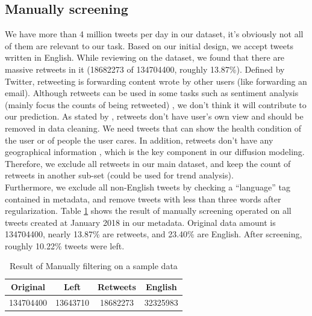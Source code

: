\subsection{Manually screening}
\label{sec:Manually screening}
We have more than 4 million tweets per day in our dataset, it's obviously not all of them are relevant to our task. Based on our initial design, we accept tweets written in English. While reviewing on the dataset, we found that there are massive retweets in it (18682273 of 134704400, roughly 13.87\%). Defined by Twitter\cite{twitter_dev}, retweeting is forwarding content wrote by other users (like forwarding an email). Although retweets can be used in some tasks such as sentiment analysis (mainly focus the counts of being retweeted) \cite{perdana2018combining}, we don't think it will contribute to our prediction. As stated by \cite{kim2016competitive}, retweets don't have user's own view and should be removed in data cleaning. We need tweets that can show the health condition of the user or of people the user cares. In addition, retweets don't have any geographical information \cite{twitter_dev}, which is the key component in our diffusion modeling. Therefore, we exclude all retweets in our main dataset, and keep the count of retweets in another sub-set (could be used for trend analysis).\\ Furthermore, we exclude all non-English tweets by checking a ``language'' tag contained in metadata, and remove tweets with less than three words after regularization. Table \ref{tab:manual} shows the result of manually screening operated on all tweets created at January 2018 in our metadata. Original data amount is 134704400, nearly 13.87\% are retweets, and 23.40\% are English. After screening, roughly 10.22\% tweets were left.
\begin{table}[!htbp]
    \centering
    \hspace{0.5cm}
    \begin{tabular}{cccc}
        Original & Left & Retweets & English\\ \hline
        134704400 & 13643710 & 18682273 & 32325983
    \end{tabular}
    \caption{Result of Manually filtering on a sample data}
    \label{tab:manual}
\end{table}


